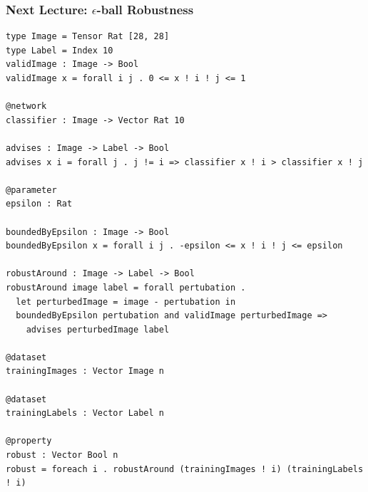 \documentclass[aspectratio=169]{beamer}
\begin{document}
\begin{frame}[fragile]
\frametitle{Next Lecture: $\epsilon$-ball Robustness}
 \begin{verbatim}
type Image = Tensor Rat [28, 28]
type Label = Index 10
validImage : Image -> Bool
validImage x = forall i j . 0 <= x ! i ! j <= 1

@network
classifier : Image -> Vector Rat 10

advises : Image -> Label -> Bool
advises x i = forall j . j != i => classifier x ! i > classifier x ! j

@parameter
epsilon : Rat

boundedByEpsilon : Image -> Bool
boundedByEpsilon x = forall i j . -epsilon <= x ! i ! j <= epsilon

robustAround : Image -> Label -> Bool
robustAround image label = forall pertubation .
  let perturbedImage = image - pertubation in
  boundedByEpsilon pertubation and validImage perturbedImage =>
    advises perturbedImage label

@dataset
trainingImages : Vector Image n

@dataset
trainingLabels : Vector Label n

@property
robust : Vector Bool n
robust = foreach i . robustAround (trainingImages ! i) (trainingLabels ! i)
\end{verbatim}
\end{frame}
\end{document}
